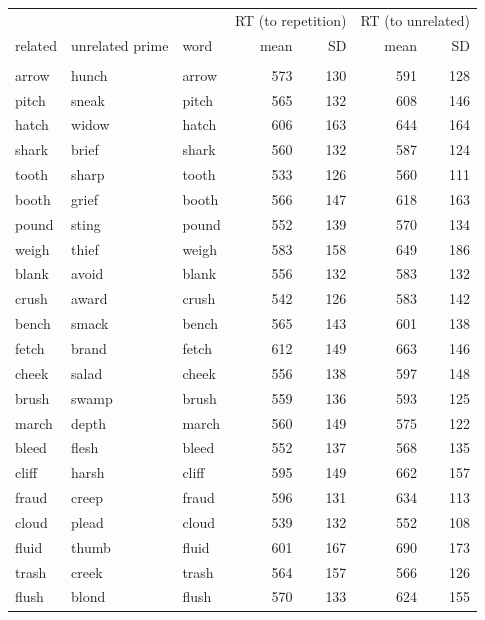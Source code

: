 \documentclass[
]{interact}
\begin{document}
\begin{table}
\fontsize{12.0pt}{14.4pt}\selectfont
\begin{tabular*}{\linewidth}{@{\extracolsep{\fill}}lllrrrr}
\toprule
 &  &  & \multicolumn{2}{c}{RT (to repetition)} & \multicolumn{2}{c}{RT (to unrelated)} \\ 
\cmidrule(lr){4-5} \cmidrule(lr){6-7}
related & unrelated prime & word & mean & SD & mean & SD \\ 
\midrule\addlinespace[2.5pt]
\multicolumn{7}{l}{\emph{low frequency condition}} \\[2.5pt] 
\midrule\addlinespace[2.5pt]
arrow & hunch & arrow & 573 & 130 & 591 & 128 \\ 
pitch & sneak & pitch & 565 & 132 & 608 & 146 \\ 
hatch & widow & hatch & 606 & 163 & 644 & 164 \\ 
shark & brief & shark & 560 & 132 & 587 & 124 \\ 
tooth & sharp & tooth & 533 & 126 & 560 & 111 \\ 
booth & grief & booth & 566 & 147 & 618 & 163 \\ 
pound & sting & pound & 552 & 139 & 570 & 134 \\ 
weigh & thief & weigh & 583 & 158 & 649 & 186 \\ 
blank & avoid & blank & 556 & 132 & 583 & 132 \\ 
crush & award & crush & 542 & 126 & 583 & 142 \\ 
bench & smack & bench & 565 & 143 & 601 & 138 \\ 
fetch & brand & fetch & 612 & 149 & 663 & 146 \\ 
cheek & salad & cheek & 556 & 138 & 597 & 148 \\ 
brush & swamp & brush & 559 & 136 & 593 & 125 \\ 
march & depth & march & 560 & 149 & 575 & 122 \\ 
bleed & flesh & bleed & 552 & 137 & 568 & 135 \\ 
cliff & harsh & cliff & 595 & 149 & 662 & 157 \\ 
fraud & creep & fraud & 596 & 131 & 634 & 113 \\ 
cloud & plead & cloud & 539 & 132 & 552 & 108 \\ 
fluid & thumb & fluid & 601 & 167 & 690 & 173 \\ 
trash & creek & trash & 564 & 157 & 566 & 126 \\ 
flush & blond & flush & 570 & 133 & 624 & 155 \\ 

\end{tabular*}
\end{table}
\end{document}
